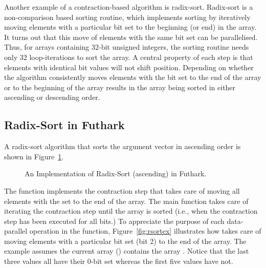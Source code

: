 \documentclass[oneside,11pt]{book}
\newenvironment{wrap}{\vspace{\topskip}\par\noindent\begin{minipage}{\linewidth}}{\end{minipage}\par}
\begin{document}
Another example of a contraction-based algorithm is
radix-sort. Radix-sort is a non-comparison based sorting routine,
which implements sorting by iteratively moving elements with a
particular bit set to the beginning (or end) in the array. It turns
out that this move of elements with the same bit set can be
parallelised. Thus, for arrays containing 32-bit unsigned integers,
the sorting routine needs only 32 loop-iterations to sort the array. A
central property of each step is that elements with identical bit
values will not shift position. Depending on whether the algorithm
consistently moves elements with the bit set to the end of the array
or to the beginning of the array results in the array being sorted in
either ascending or descending order.

\subsection{Radix-Sort in Futhark}
\label{sec:radixsort}

A radix-sort algorithm that sorts the argument vector in ascending
order is shown in Figure~\ref{fig:rsort}.

\begin{figure}
\begin{wrap}

\end{wrap}
\caption{An Implementation of Radix-Sort (ascending) in Futhark.}
\label{fig:rsort}
\end{figure}

The function  implements the contraction step that
takes care of moving all elements with the  set to the end of
the array. The main function  takes care of iterating the
contraction step until the array is sorted (i.e., when the contraction
step has been executed for all bits.) To appreciate the purpose of
each data-parallel operation in the  function,
Figure~\ref{fig:rsortex} illustrates how  takes care
of moving elements with a particular bit set (bit 2) to the end of the
array. The example assumes the current array () contains the
array \kw{[2,0,6,4,2,1,5,9]}. Notice that the last three values all
have their 0-bit set whereas the first five values have not.
\end{document}
